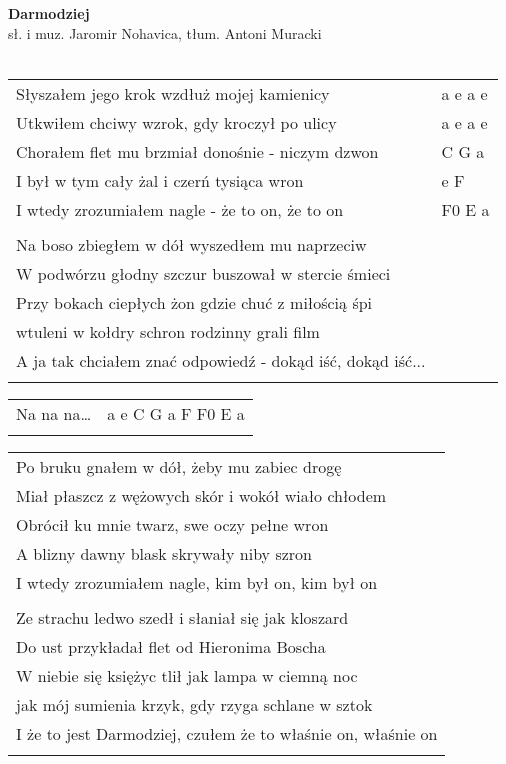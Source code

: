 \documentclass[a5paper]{article}
\begin{document}


\noindent
\fontsize{12pt}{15pt}\selectfont
\textbf{Darmodziej} \\
\fontsize{8pt}{10pt}\selectfont
sł. i muz. Jaromir Nohavica, tłum. Antoni Muracki \\ \\
\fontsize{10pt}{12pt}\selectfont
{}
\begin{tabular}{@{}p{9cm}p{3cm}@{}}
\noindent
Słyszałem jego krok wzdłuż mojej kamienicy & a e a e \\
Utkwiłem chciwy wzrok, gdy kroczył po ulicy & a e a e \\
Chorałem flet mu brzmiał donośnie - niczym dzwon & C G a \\
I był w tym cały żal i czerń tysiąca wron & e F \\
I wtedy zrozumiałem nagle - że to on, że to on & F0 E a \\ \\

Na boso zbiegłem w dół wyszedłem mu naprzeciw \\
W podwórzu głodny szczur buszował w stercie śmieci \\
Przy bokach ciepłych żon gdzie chuć z miłością śpi \\
wtuleni w kołdry schron rodzinny grali film \\
A ja tak chciałem znać odpowiedź - dokąd iść, dokąd iść... \\ \\
\end{tabular}

\noindent
\begin{tabular}{@{}p{6cm}p{3cm}@{}}
Na na na… & a e C G a F F0 E a \\ \\
\end{tabular}

\noindent
\begin{tabular}{@{}p{9.5cm}@{}}
Po bruku gnałem w dół, żeby mu zabiec drogę \\ 
Miał płaszcz z wężowych skór i wokół wiało chłodem \\
Obrócił ku mnie twarz, swe oczy pełne wron \\
A blizny dawny blask skrywały niby szron \\
I wtedy zrozumiałem nagle, kim był on, kim był on \\ \\

Ze strachu ledwo szedł i słaniał się jak kloszard \\
Do ust przykładał flet od Hieronima Boscha \\
W niebie się księżyc tlił jak lampa w ciemną noc \\
jak mój sumienia krzyk, gdy rzyga schlane w sztok  \\
I że to jest Darmodziej, czułem że to właśnie on, właśnie on \\ \\
\end{tabular}
\end{document}
